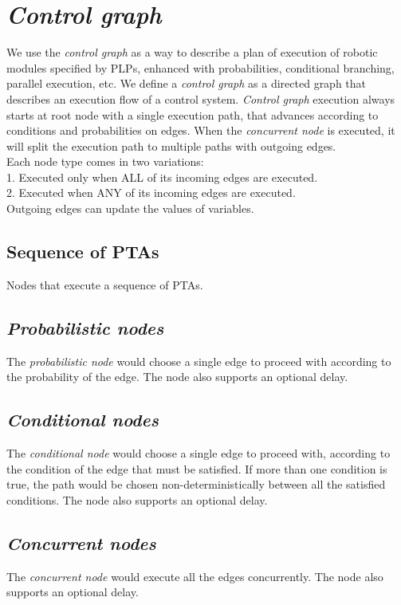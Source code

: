 \chapter{\textit{Control graph}}
We use the \textit{control graph} as a way to describe a plan of execution of robotic modules specified by PLPs, enhanced with probabilities, conditional branching, parallel execution, etc. We define a \textit{control graph} as a directed graph that describes an execution flow of a control system. \textit{Control graph} execution always starts at root node with a single execution path, that advances according to conditions and probabilities on edges. When the \textit{concurrent node} is executed, it will split the execution path to multiple paths with outgoing edges. \\
Each node type comes in two variations: \\
            1. Executed only when ALL of its incoming edges are executed.\\
            2. Executed when ANY of its incoming edges are executed.\\
Outgoing edges can update the values of variables.\\
\clearpage
\section{Sequence of PTAs}
Nodes that execute a sequence of PTAs.   \clearpage
\section{\textit{Probabilistic nodes}}
The \textit{probabilistic node} would choose a single edge to proceed with according to the probability of the edge. The node also supports an optional delay.  \clearpage
\section{\textit{Conditional nodes}}
The \textit{conditional node} would choose a single edge to proceed with, according to the condition of the edge that must be satisfied. If more than one condition is true, the path would be chosen non-deterministically between all the satisfied conditions. The node also supports an optional delay.   \clearpage
\section{\textit{Concurrent nodes}}
The \textit{concurrent node} would execute all the edges concurrently. The node also supports an optional delay.  \clearpage
